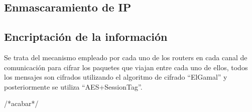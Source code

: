 \subsection{Enmascaramiento de IP}

\subsection{Encriptación de la información}

Se trata del mecanismo empleado por cada uno de los routers en cada canal de comunicación para cifrar los paquetes que viajan entre cada uno de ellos, todos los mensajes son cifrados utilizando el algoritmo de cifrado “ElGamal” y posteriormente se utiliza “AES+SessionTag”.

/*acabar*/

